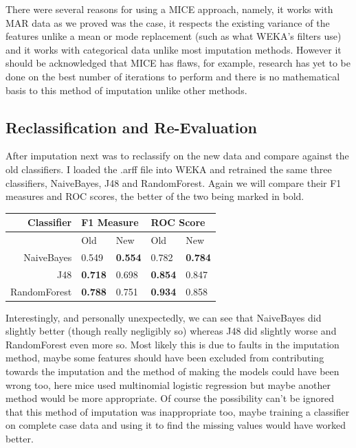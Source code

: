 There were several reasons for using a MICE approach, namely, it works with MAR data as we proved was the case, it respects the existing variance of the features unlike a mean or mode replacement (such as what WEKA's filters use) and it works with categorical data unlike most imputation methods. However it should be acknowledged that MICE has flaws, for example, research has yet to be done on the best number of iterations to perform and there is no mathematical basis to this method of imputation unlike other methods.

\subsection{Reclassification and Re-Evaluation}
After imputation next was to reclassify on the new data and compare against the old classifiers. I loaded the .arff file into WEKA and retrained the same three classifiers, NaiveBayes, J48 and RandomForest. Again we will compare their F1 measures and ROC scores, the better of the two being marked in bold.

\begin{center}
\begin{tabular}{|r|l|l|l|l|}
\hline 
Classifier & \multicolumn{2}{l|}{F1 Measure} & \multicolumn{2}{l|}{ROC Score} \\ 
\hline 
 & Old & New & Old & New \\ 
\hline 
NaiveBayes & 0.549 & \textbf{0.554} & 0.782 & \textbf{0.784} \\ 
\hline 
J48 & \textbf{0.718} & 0.698 & \textbf{0.854} & 0.847 \\ 
\hline 
RandomForest & \textbf{0.788} & 0.751 & \textbf{0.934} & 0.858 \\
\hline 
\end{tabular}
\end{center}

Interestingly, and personally unexpectedly, we can see that NaiveBayes did slightly better (though really negligibly so) whereas J48 did slightly worse and RandomForest even more so. Most likely this is due to faults in the imputation method, maybe some features should have been excluded from contributing towards the imputation and the method of making the models could have been wrong too, here mice used multinomial logistic regression but maybe another method would be more appropriate. Of course the possibility can't be ignored that this method of imputation was inappropriate too, maybe training a classifier on complete case data and using it to find the missing values would have worked better. 